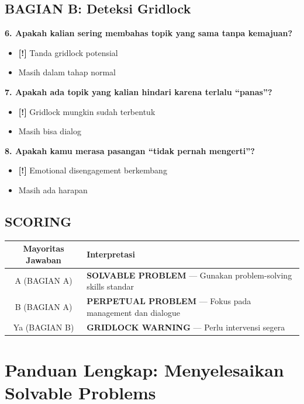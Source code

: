 \begin{exercisebox}
\subsection*{BAGIAN B: Deteksi Gridlock}

\textbf{6. Apakah kalian sering membahas topik yang sama tanpa kemajuan?}
\begin{itemize}
    \item[Ya] \textcolor{accent}{\textbf{[!]}} Tanda gridlock potensial
    \item[Tidak] Masih dalam tahap normal
\end{itemize}

\textbf{7. Apakah ada topik yang kalian hindari karena terlalu ``panas''?}
\begin{itemize}
    \item[Ya] \textcolor{accent}{\textbf{[!]}} Gridlock mungkin sudah terbentuk
    \item[Tidak] Masih bisa dialog
\end{itemize}

\textbf{8. Apakah kamu merasa pasangan ``tidak pernah mengerti''?}
\begin{itemize}
    \item[Ya] \textcolor{accent}{\textbf{[!]}} Emotional disengagement berkembang
    \item[Tidak] Masih ada harapan
\end{itemize}

\subsection*{SCORING}

\begin{center}
\renewcommand{\arraystretch}{1.4}
\begin{tabular}{|c|p{8cm}|}
\hline
\rowcolor{primary!20}
\textbf{Mayoritas Jawaban} & \textbf{Interpretasi} \\
\hline
A (BAGIAN A) & \textbf{SOLVABLE PROBLEM} --- Gunakan problem-solving skills standar \\
\hline
B (BAGIAN A) & \textbf{PERPETUAL PROBLEM} --- Fokus pada management dan dialogue \\
\hline
Ya (BAGIAN B) & \textbf{GRIDLOCK WARNING} --- Perlu intervensi segera \\
\hline
\end{tabular}
\end{center}
\end{exercisebox}

\section{Panduan Lengkap: Menyelesaikan Solvable Problems}

